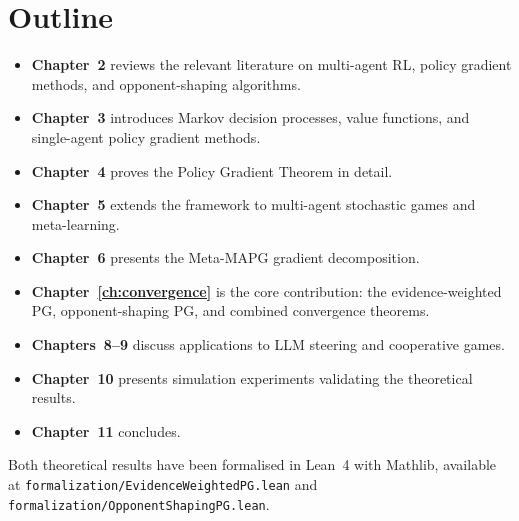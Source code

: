 \section{Outline}

\begin{itemize}
    \item \textbf{Chapter~2} reviews the relevant literature on multi-agent RL, policy gradient methods, and opponent-shaping algorithms.
    \item \textbf{Chapter~3} introduces Markov decision processes, value functions, and single-agent policy gradient methods.
    \item \textbf{Chapter~4} proves the Policy Gradient Theorem in detail.
    \item \textbf{Chapter~5} extends the framework to multi-agent stochastic games and meta-learning.
    \item \textbf{Chapter~6} presents the Meta-MAPG gradient decomposition.
    \item \textbf{Chapter~\ref{ch:convergence}} is the core contribution: the evidence-weighted PG, opponent-shaping PG, and combined convergence theorems.
    \item \textbf{Chapters~8--9} discuss applications to LLM steering and cooperative games.
    \item \textbf{Chapter~10} presents simulation experiments validating the theoretical results.
    \item \textbf{Chapter~11} concludes.
\end{itemize}

Both theoretical results have been formalised in Lean~4 with Mathlib, available at \texttt{formalization/EvidenceWeightedPG.lean} and \texttt{formalization/OpponentShapingPG.lean}.

